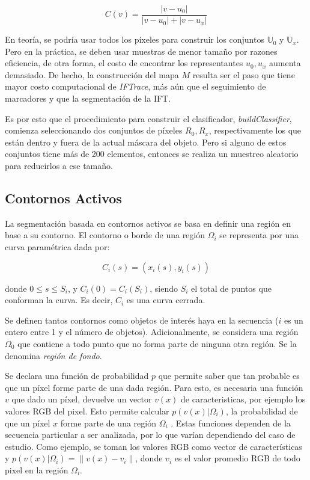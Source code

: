 \documentclass[a4paper,10pt]{article}
\begin{document}
\begin{equation}
   \label{eq:IFTrace-color-classifier}
   C(v) = \frac{|v - u_{0}|}{|v - u_{0}| + |v - u_{x}|}
\end{equation}

En teoría, se podría usar todos los píxeles para construir los conjuntos
$\mathbb{U}_{0}$ y $\mathbb{U}_{x}$. Pero en la práctica, se deben usar muestras
de menor tamaño por razones eficiencia, de otra forma, el costo de encontrar los
representantes $u_{0},u_{x}$ aumenta demasiado. De hecho, la construcción del mapa
$M$ resulta ser el paso que tiene mayor costo computacional de \textit{IFTrace}, más
aún que el seguimiento de marcadores y que la segmentación de la IFT.

Es por esto que el procedimiento para construir el clasificador,
\textit{buildClassifier}, comienza seleccionando dos conjuntos de píxeles
$R_{0},R_{x}$, respectivamente los que están dentro y fuera de la actual máscara
del objeto. Pero si alguno de estos conjuntos tiene más de 200 elementos,
entonces se realiza un muestreo aleatorio para reducirlos a ese tamaño.

\subsection{Contornos Activos}

La segmentación basada en contornos activos se basa en definir una región en base a su contorno.
El contorno o borde de una región $\Omega_i$ se representa por una curva paramétrica dada por:

\begin{equation}
    C_i(s) = (x_i(s), y_i(s))
\end{equation}

donde $0 \leq s \leq S_i$, y $C_i(0) = C_i(S_i)$, siendo $S_i$ el total de puntos que conforman la curva.
Es decir, $C_i$ es una curva cerrada.

Se definen tantos contornos como objetos de interés haya en la secuencia ($i$ es un entero entre 1 y el número de objetos).
Adicionalmente, se considera una región $\Omega_0$ que contiene a todo punto que no forma parte de ninguna otra región.
Se la denomina \textit{región de fondo}.

Se declara una función de probabilidad $p$ que permite saber que tan probable es que un píxel forme parte de una dada región.
Para esto, es necesaria una función $v$ que dado un píxel, devuelve un vector $v(x)$ de caracteristicas, por ejemplo los valores RGB del pixel.
Esto permite calcular $p(v(x) \vert \Omega_i)$, la probabilidad de que un píxel $x$ forme parte de una región $\Omega_i$ .
Estas funciones dependen de la secuencia particular a ser analizada, por lo que varían dependiendo del caso de estudio.
Como ejemplo, se toman los valores RGB como vector de características y
$p(v(x) \vert \Omega_i) = \| v(x) - v_i \| $, donde $v_i$ es el valor promedio RGB de todo pixel en la región $\Omega_i$.
\end{document}
